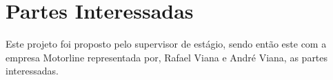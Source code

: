 \section{Partes Interessadas}

Este projeto foi proposto pelo supervisor de estágio, sendo então este com a empresa Motorline representada 
por, Rafael Viana e André Viana, as partes interessadas.